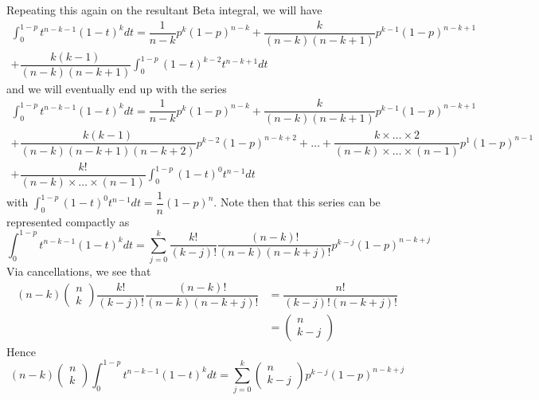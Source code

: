 \documentclass[11pt]{report} %
\begin{document}
Repeating this again on the resultant Beta integral, we will have
\begin{multline}
\int_{0}^{1 - p}t^{n - k - 1}\left(1 - t\right)^{k}dt = \dfrac{1}{n - k}p^{k}\left(1 - p\right)^{n - k} + \dfrac{k}{\left(n - k\right)\left(n - k + 1\right)}p^{k - 1}\left(1 - p\right)^{n - k + 1} \\
 + \dfrac{k\left(k - 1\right)}{\left(n - k\right)\left(n - k + 1\right)}\int_{0}^{1 - p}\left(1 - t\right)^{k - 2}t^{n - k + 1}dt
\end{multline}
and we will eventually end up with the series
\begin{multline}
\int_{0}^{1 - p}t^{n - k - 1}\left(1 - t\right)^{k}dt = \dfrac{1}{n - k}p^{k}\left(1 - p\right)^{n - k} + \dfrac{k}{\left(n - k\right)\left(n - k + 1\right)}p^{k - 1}\left(1 - p\right)^{n - k + 1} \\
 + \dfrac{k\left(k - 1\right)}{\left(n - k\right)\left(n - k + 1\right)\left(n - k + 2\right)}p^{k - 2}\left(1 - p\right)^{n - k + 2} + \dots + \dfrac{k\times\dots\times 2}{\left(n - k\right)\times\dots\times\left(n - 1\right)}p^{1}\left(1 - p\right)^{n - 1} \\
  + \dfrac{k!}{\left(n - k\right)\times\dots\times\left(n - 1\right)}\int_{0}^{1 - p}\left(1 - t\right)^{0}t^{n - 1}dt
\end{multline}
with $\int_{0}^{1 - p}\left(1 - t\right)^{0}t^{n - 1}dt = \dfrac{1}{n}\left(1 - p\right)^{n}$. Note then that this series can be represented compactly as
\begin{equation}
\int_{0}^{1 - p}t^{n - k - 1}\left(1 - t\right)^{k}dt = \sum_{j = 0}^{k}\dfrac{k!}{\left(k - j\right)!}\dfrac{\left(n - k\right)!}{\left(n - k\right)\left(n - k + j\right)!}p^{k - j}\left(1 - p\right)^{n - k + j}
\end{equation}
Via cancellations, we see that
\begin{align}
\left(n - k\right)\begin{pmatrix}n \\ k\end{pmatrix}\dfrac{k!}{\left(k - j\right)!}\dfrac{\left(n - k\right)!}{\left(n - k\right)\left(n - k + j\right)!} &= \dfrac{n!}{\left(k - j\right)!\left(n - k + j\right)!} \\
&= \begin{pmatrix}n \\ k - j\end{pmatrix}
\end{align}
Hence
\begin{equation}
\left(n - k\right)\begin{pmatrix}n \\ k\end{pmatrix}\int_{0}^{1 - p}t^{n - k - 1}\left(1 - t\right)^{k}dt = \sum_{j = 0}^{k}\begin{pmatrix}n \\ k - j\end{pmatrix}p^{k - j}\left(1 - p\right)^{n - k + j}
\end{equation}
\end{document}
